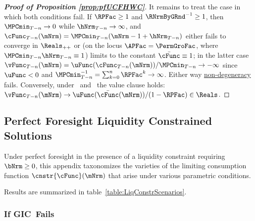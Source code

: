 \documentclass[\econtexRoot/BufferStockTheory]{subfiles}
\begin{document}
\begin{proof}[\textbf{Proof of Proposition \ref{prop:pfUCFHWC}}]
It remains to treat the case in which both conditions fail. If $\RPFac\geq1$ and $\RNrmByGRnd^{-1}\geq1$, then $\MPCmin_{T-n}\to0$ while $\hNrm_{T-n}\to\infty$, and $\cFunc_{T-n}(\mNrm)=\MPCmin_{T-n}(\mNrm-1+\hNrm_{T-n})$ either fails to converge in $\Reals_{++}$ or (on the locus $\APFac=\PermGroFac$, where $\MPCmin_{T-n}\hNrm_{T-n}\equiv1$) limits to the constant $\bar{\cFunc}\equiv1$; in the latter case $\vFunc_{T-n}(\mNrm)=\uFunc(\cFunc_{T-n}(\mNrm))/\MPCmin_{T-n}\to-\infty$ since $\uFunc<0$ and $\MPCmin_{T-n}^{-1}=\sum_{k=0}^{n}\RPFac^{k}\to\infty$. Either way \hyperref[def:nondegeneracy]{non-degeneracy} fails. Conversely, under \RIC~and \FHWC~the value clause holds: $\vFunc_{T-n}(\mNrm)\to\uFunc(\bar{\cFunc}(\mNrm))/(1-\RPFac)\in\Reals$.

\end{proof}

\subsection{Perfect Foresight Liquidity Constrained Solutions}

Under perfect foresight in the presence of a liquidity constraint requiring $\bNrm \geq 0$, this appendix taxonomizes the varieties of the limiting consumption function $\cnstr{\cFunc}(\mNrm)$ that arise under various parametric conditions.



Results are summarized in table~\ref{table:LiqConstrScenarios}.

\subsubsection{If {GIC}~Fails}
\end{document}
